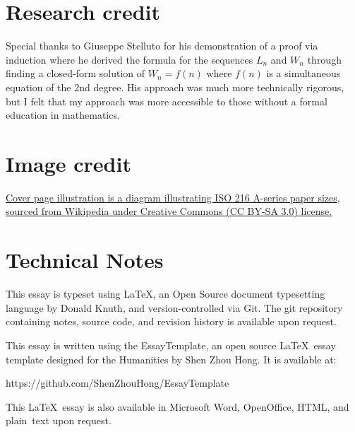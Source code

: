 
\section*{Research credit}
Special thanks to Giuseppe Stelluto for his demonstration of a proof via induction where he derived the formula for the sequences $L_n$ and $W_n$ through finding a closed-form solution of $W_n = f(n)$ where $f(n)$ is a simultaneous equation of the 2nd degree. His approach was much more technically rigorous, but I felt that my approach was more accessible to those without a formal education in mathematics.

\section*{Image credit}
\href{https://en.wikipedia.org/wiki/File:A_size_illustration2.svg}{Cover page illustration is a diagram illustrating ISO 216 A-series paper sizes, sourced from Wikipedia under Creative Commons (CC BY-SA 3.0) license.}

\section*{Technical Notes}
This essay is typeset using \LaTeX, an Open Source document typesetting language
by Donald Knuth, and version-controlled via Git. The git repository containing notes, source code, and revision history is available upon request.


\noindent
This essay is written using the EssayTemplate, an open source \LaTeX\ essay
template designed for the Humanities by Shen Zhou Hong. It is available at:

https://github.com/ShenZhouHong/EssayTemplate

\vfill
\begin{center}
This \LaTeX\ essay is also available in Microsoft Word, OpenOffice, HTML, and \mbox{plain text} upon request.
\end{center}

